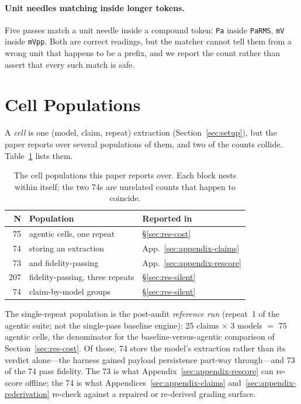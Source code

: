 \documentclass[11pt]{article}
\begin{document}
\paragraph{Unit needles matching inside longer tokens.} Five passes
match a unit needle inside a compound token: \texttt{Pa} inside
\texttt{PaRMS}, \texttt{mV} inside \texttt{mVpp}. Both are correct
readings, but the matcher cannot tell them from a wrong unit that
happens to be a prefix, and we report the count rather than assert that
every such match is safe.

\section{Cell Populations}
\label{sec:appendix-cells}

A \emph{cell} is one (model, claim, repeat) extraction
(Section~\ref{sec:setup}), but the paper reports over several
populations of them, and two of the counts collide.
Table~\ref{tab:cells} lists them.

\begin{table}[ht]
\centering
\small
\setlength{\tabcolsep}{4pt}
\begin{tabular}{@{}rll@{}}
\toprule
\textbf{N} & \textbf{Population} & \textbf{Reported in} \\
\midrule
75  & agentic cells, one repeat        & \S\ref{sec:res-cost} \\
74  & \hspace{1.2em}storing an extraction        & App.~\ref{sec:appendix-claims} \\
73  & \hspace{1.2em}and fidelity-passing         & App.~\ref{sec:appendix-rescore} \\
\midrule
207 & fidelity-passing, three repeats  & \S\ref{sec:res-silent} \\
74  & \hspace{1.2em}claim-by-model groups        & \S\ref{sec:res-silent} \\
\bottomrule
\end{tabular}
\caption{The cell populations this paper reports over. Each block
nests within itself; the two 74s are unrelated counts that happen to
coincide.}
\label{tab:cells}
\end{table}

The single-repeat population is the post-audit \emph{reference run}
(repeat~1 of the agentic suite; not the single-pass baseline engine):
25 claims $\times$ 3 models $=$ 75 agentic cells, the denominator for the
baseline-versus-agentic comparison of Section~\ref{sec:res-cost}. Of
those, 74 store the model's extraction rather than its verdict
alone---the harness gained payload persistence part-way
through---and 73 of the 74 pass fidelity. The 73 is what
Appendix~\ref{sec:appendix-rescore} can re-score offline; the 74 is what
Appendices~\ref{sec:appendix-claims}
and~\ref{sec:appendix-rederivation} re-check against a repaired or
re-derived grading surface.
\end{document}
